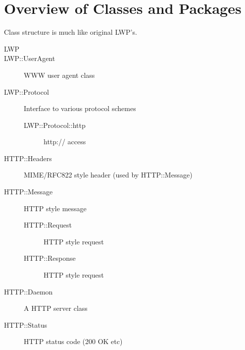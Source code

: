 \documentclass{article}
\begin{document}
\part*{Overview of Classes and Packages}
    Class structure is much like original LWP's.
    \begin{description}
        \item[LWP]
        \item[LWP::UserAgent] WWW user agent class
        \item[LWP::Protocol] Interface to various protocol schemes
        \begin{description}
            \item[LWP::Protocol::http] http:// access
        \end{description}
        \item[HTTP::Headers] MIME/RFC822 style header (used by HTTP::Message)
        \item[HTTP::Message] HTTP style message
        \begin{description}
            \item[HTTP::Request] HTTP style request
            \item[HTTP::Response] HTTP style request
        \end{description}
        \item[HTTP::Daemon] A HTTP server class
        \item[HTTP::Status] HTTP status code (200 OK etc)
    \end{description}
\end{document}
